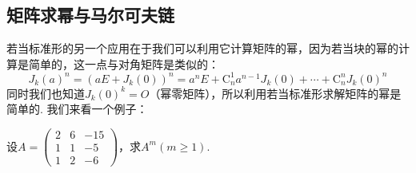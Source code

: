 \subsection{矩阵求幂与马尔可夫链}

若当标准形的另一个应用在于我们可以利用它计算矩阵的幂，因为若当块的幂的计算是简单的，这一点与对角矩阵是类似的：
\[J_k(a)^n=(aE+J_k(0))^n=a^nE+\mathrm{C}_n^1a^{n-1}J_k(0)+\cdots+\mathrm{C}_n^nJ_k(0)^n\]
同时我们也知道$J_k(0)^k=O$（幂零矩阵），所以利用若当标准形求解矩阵的幂是简单的. 我们来看一个例子：
\begin{example}{}{}
    设$A=\begin{pmatrix}
            2 & 6 & -15 \\ 1 & 1 & -5 \\ 1 & 2 & -6
        \end{pmatrix}$，求$A^{m}(m\geqslant 1)$.
\end{example}
\begin{solution}

\end{solution}

